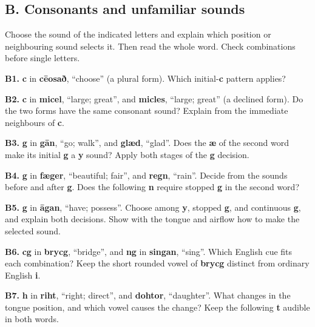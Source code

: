 \subsection*{B. Consonants and unfamiliar sounds}

Choose the sound of the indicated letters and explain which position or neighbouring sound selects it. Then read the whole word. Check combinations before single letters.

\textbf{B1.} \textbf{c} in \textbf{cēosað}, “choose” (a plural form). Which initial-\textbf{c} pattern applies?

\textbf{B2.} \textbf{c} in \textbf{micel}, “large; great”, and \textbf{micles}, “large; great” (a declined form). Do the two forms have the same consonant sound? Explain from the immediate neighbours of \textbf{c}.

\textbf{B3.} \textbf{g} in \textbf{gān}, “go; walk”, and \textbf{glæd}, “glad”. Does the \textbf{æ} of the second word make its initial \textbf{g} a \textbf{y} sound? Apply both stages of the \textbf{g} decision.

\textbf{B4.} \textbf{g} in \textbf{fæger}, “beautiful; fair”, and \textbf{regn}, “rain”. Decide from the sounds before and after \textbf{g}. Does the following \textbf{n} require stopped \textbf{g} in the second word?

\textbf{B5.} \textbf{g} in \textbf{āgan}, “have; possess”. Choose among \textbf{y}, stopped \textbf{g}, and continuous \textbf{g}, and explain both decisions. Show with the tongue and airflow how to make the selected sound.

\textbf{B6.} \textbf{cg} in \textbf{brycg}, “bridge”, and \textbf{ng} in \textbf{singan}, “sing”. Which English cue fits each combination? Keep the short rounded vowel of \textbf{brycg} distinct from ordinary English \textbf{i}.

\textbf{B7.} \textbf{h} in \textbf{riht}, “right; direct”, and \textbf{dohtor}, “daughter”. What changes in the tongue position, and which vowel causes the change? Keep the following \textbf{t} audible in both words.

